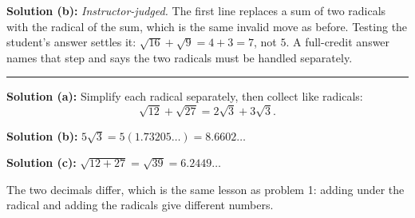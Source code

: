 \documentclass[12pt]{article}
\begin{document}
\textbf{Solution (b):} \emph{Instructor-judged.} The first line replaces a sum of
two radicals with the radical of the sum, which is the same invalid move as
before. Testing the student's answer settles it: $\sqrt{16}+\sqrt{9} = 4+3 = 7$,
not $5$. A full-credit answer names that step and says the two radicals must be
handled separately.

\vspace{0.2cm}\noindent\rule{\linewidth}{0.2pt}\vspace{0.2cm}


\textbf{Solution (a):} Simplify each radical separately, then collect like
radicals:
\[ \sqrt{12} + \sqrt{27} = 2\sqrt{3} + 3\sqrt{3} . \]

\textbf{Solution (b):} $5\sqrt{3} = 5(1.73205\ldots) = 8.6602\ldots$

\textbf{Solution (c):} $\sqrt{12+27} = \sqrt{39} = 6.2449\ldots$ 

The two decimals differ, which is the same lesson as problem 1: adding under the
radical and adding the radicals give different numbers.
\end{document}
